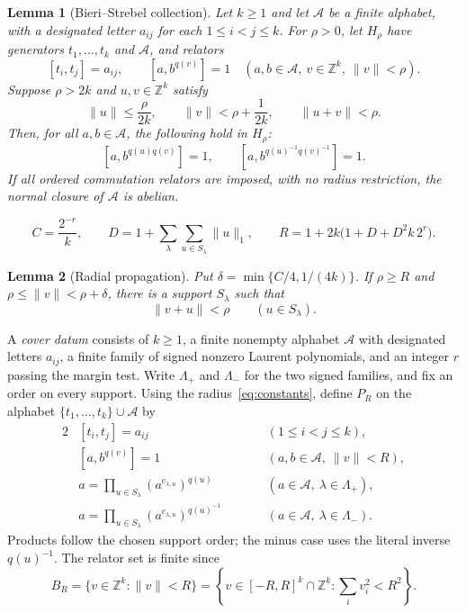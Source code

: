 \documentclass[10pt,a4paper]{amsart}
\newtheorem{lemma}{Lemma}
\newcommand{\Z}{\mathbb Z}
\newcommand{\norm}[1]{\lVert #1\rVert}
\begin{document}
\begin{lemma}[Bieri--Strebel collection]
\label{lem:collection}
Let $k\ge1$ and let $\mathcal A$ be a finite alphabet, with a designated letter $a_{ij}$
for each $1\le i<j\le k$. For $\rho>0$, let $H_\rho$ have generators
$t_1,\ldots,t_k$ and $\mathcal A$, and relators
\[
 [t_i,t_j]=a_{ij},\qquad
 [a,b^{q(v)}]=1
 \quad(a,b\in\mathcal A,\ v\in\Z^k,\ \norm v<\rho).
\]
Suppose $\rho>2k$ and $u,v\in\Z^k$ satisfy
\begin{equation}
\label{eq:collection}
 \norm u\le \frac{\rho}{2k},\qquad
 \norm v<\rho+\frac1{2k},\qquad
 \norm{u+v}<\rho.
\end{equation}
Then, for all $a,b\in\mathcal A$, the following hold in $H_\rho$:
\[
 [a,b^{q(u)q(v)}]=1,\qquad
 [a,b^{q(u)^{-1}q(v)^{-1}}]=1.
\]
If all ordered commutation relators are imposed, with no radius
restriction, the normal closure of $\mathcal A$ is abelian.
\end{lemma}

\begin{equation}
\label{eq:constants}
 C=\frac{2^{-r}}{k},\qquad
 D=1+\sum_\lambda\sum_{u\in S_\lambda}\norm u_1,\qquad
 R=1+2k\bigl(1+D+D^2k\,2^r\bigr).
\end{equation}

\begin{lemma}[Radial propagation]
\label{lem:shrink}
Put $\delta=\min\{C/4,1/(4k)\}$. If $\rho\ge R$ and
$\rho\le\norm v<\rho+\delta$, there is a support $S_\lambda$ such that
\[
 \norm{v+u}<\rho \qquad(u\in S_\lambda).
\]
\end{lemma}

A \emph{cover datum} consists of $k\ge1$, a finite nonempty alphabet
$\mathcal A$ with designated letters $a_{ij}$, a finite family of signed
nonzero Laurent polynomials, and an integer $r$ passing the margin test.
Write $\Lambda_+$ and $\Lambda_-$ for the two signed families, and
fix an order on every support. Using the radius~\eqref{eq:constants},
define $P_R$ on the alphabet $\{t_1,\ldots,t_k\}\cup\mathcal A$ by
\begin{alignat}{2}
 &[t_i,t_j]=a_{ij}
   &\qquad &(1\le i<j\le k), \label{eq:cover-t}\\[3pt]
 &[a,b^{q(v)}]=1
   &\qquad &(a,b\in\mathcal A,\ \norm v<R), \label{eq:cover-short}\\[3pt]
 &a=\prod_{u\in S_\lambda}(a^{c_{\lambda,u}})^{q(u)}
   &\qquad &(a\in\mathcal A,\ \lambda\in\Lambda_+), \label{eq:cover-plus}\\[3pt]
 &a=\prod_{u\in S_\lambda}(a^{c_{\lambda,u}})^{q(u)^{-1}}
   &\qquad &(a\in\mathcal A,\ \lambda\in\Lambda_-). \label{eq:cover-minus}
\end{alignat}
Products follow the chosen support order; the minus case uses the
literal inverse $q(u)^{-1}$. The relator set is finite since
\[
 B_R=\{v\in\Z^k:\norm v<R\}
 =\left\{v\in[-R,R]^k\cap\Z^k:\sum_i v_i^2<R^2\right\}.
\]
\end{document}
